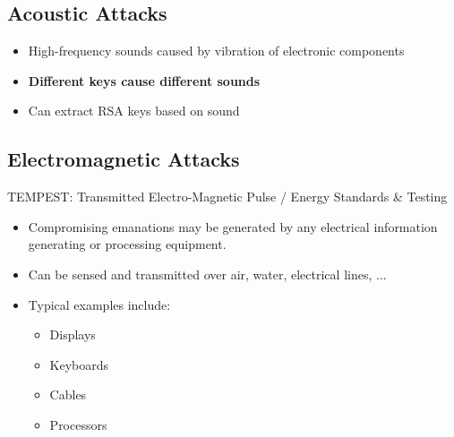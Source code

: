 \subsection{Acoustic Attacks}
\begin{itemize}
  \item High-frequency sounds caused by vibration of
    electronic components
  \item \textbf{Different keys cause different sounds}
  \item Can extract RSA keys based on sound
\end{itemize}

\subsection{Electromagnetic Attacks}
TEMPEST: Transmitted Electro-Magnetic Pulse / Energy
Standards \& Testing
\begin{itemize}
  \item Compromising emanations may be generated by any electrical information generating or processing equipment.
  \item Can be sensed and transmitted over air, water, electrical lines, ...
  \item Typical examples include:
    \begin{itemize}
      \item Displays
      \item Keyboards
      \item Cables
      \item Processors
    \end{itemize}
\end{itemize}
